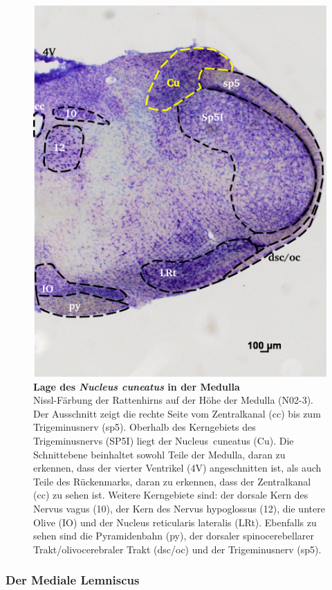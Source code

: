 \documentclass[12pt,a4paper,pdftex]{article}
\begin{document}
\begin{figure}[H]
    \centering
    \includegraphics{pictures/somatosensory/nucleus_cuneatus.png}
    \caption[Lage des \textit{Nucleus cuneatus} in der Medulla]{\textbf{Lage des \textit{Nucleus cuneatus} in der Medulla}\\
    Nissl-Färbung der Rattenhirns auf der Höhe der Medulla (N02-3). Der Ausschnitt zeigt die rechte Seite vom Zentralkanal (cc) bis zum Trigeminusnerv (sp5). Oberhalb des Kerngebiets des Trigeminusnervs (SP5I) liegt der Nucleus~cuneatus (Cu). Die Schnittebene beinhaltet sowohl Teile der Medulla, daran zu erkennen, dass der vierter Ventrikel (4V) angeschnitten ist, als auch Teile des Rückenmarks, daran zu erkennen, dass der Zentralkanal (cc) zu sehen ist. Weitere Kerngebiete sind: der dorsale Kern des Nervus vagus (10), der Kern des Nervus hypoglossus (12), die untere Olive (IO) und der Nucleus reticularis lateralis (LRt). Ebenfalls zu sehen sind die Pyramidenbahn (py), der dorsaler spinocerebellarer Trakt/olivocerebraler Trakt (dsc/oc) und der Trigeminusnerv (sp5).}
    \label{fig:nucleus_cuneatus}
\end{figure}

\subsubsection*{Der Mediale Lemniscus}
\end{document}
